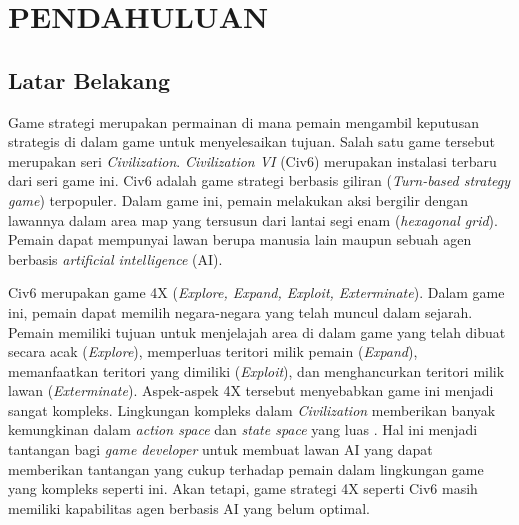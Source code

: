 \chapter{PENDAHULUAN}
\label{chap:pendahuluan}


\section{Latar Belakang}
\label{sec:latarbelakang}

Game strategi merupakan permainan di mana pemain mengambil keputusan strategis di dalam game untuk menyelesaikan tujuan. 
Salah satu game tersebut merupakan seri \emph{Civilization}. 
\emph{Civilization VI} (Civ6) merupakan instalasi terbaru dari seri game ini. 
Civ6 adalah game strategi berbasis giliran (\emph{Turn-based strategy game}) terpopuler. 
Dalam game ini, pemain melakukan aksi bergilir dengan lawannya dalam area map yang tersusun dari lantai segi enam (\emph{hexagonal grid}).
Pemain dapat mempunyai lawan berupa manusia lain maupun sebuah agen berbasis \emph{artificial intelligence} (AI).

Civ6 merupakan game 4X (\emph{Explore, Expand, Exploit, Exterminate}). Dalam game ini, pemain dapat memilih negara-negara yang telah muncul dalam sejarah. 
Pemain memiliki tujuan untuk menjelajah area di dalam game yang telah dibuat secara acak (\emph{Explore}), memperluas teritori milik pemain (\emph{Expand}), memanfaatkan teritori yang dimiliki (\emph{Exploit}), dan menghancurkan teritori milik lawan (\emph{Exterminate}). 
Aspek-aspek 4X tersebut menyebabkan game ini menjadi sangat kompleks. 
Lingkungan kompleks dalam \emph{Civilization} memberikan banyak kemungkinan dalam \emph{action space} dan \emph{state space} yang luas \citep{civ4City}.
Hal ini menjadi tantangan bagi \emph{game developer} untuk membuat lawan AI yang dapat memberikan tantangan yang cukup terhadap pemain dalam lingkungan game yang kompleks seperti ini. 
Akan tetapi, game strategi 4X seperti Civ6 masih memiliki kapabilitas agen berbasis AI yang belum optimal.

